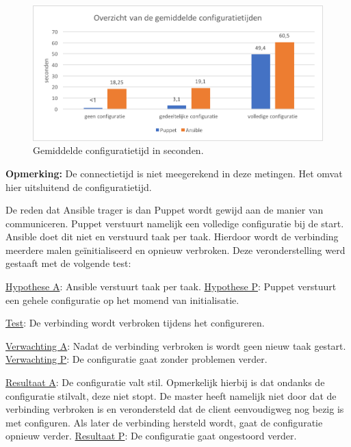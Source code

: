 \begin{figure}
	\includegraphics[width=\linewidth]{img/overzichtgemiddeldeconfigtijd.png} 
	\caption{Gemiddelde configuratietijd in seconden.}  
	\label{fig:deploytime_fullconfig}
\end{figure}

\textbf{Opmerking:} De \gls{connectietijd} is niet meegerekend in deze metingen. Het omvat hier uitsluitend de \gls{configuratietijd}.

De reden dat Ansible trager is dan Puppet wordt gewijd aan de manier van communiceren. Puppet verstuurt namelijk een volledige configuratie bij de start. Ansible doet dit niet en verstuurd taak per taak. Hierdoor wordt de verbinding meerdere malen ge\"initialiseerd en opnieuw verbroken. Deze veronderstelling werd gestaaft met de volgende test:

\begin{addmargin}[2em]{0cm}
\underline{Hypothese A}: Ansible verstuurt taak per taak.\newline
\underline{Hypothese P}: Puppet verstuurt een gehele configuratie op het momend van initialisatie.

\underline{Test}: De verbinding wordt verbroken tijdens het configureren.

\underline{Verwachting A}: Nadat de verbinding verbroken is wordt geen nieuw taak gestart.\newline
\underline{Verwachting P}: De configuratie gaat zonder problemen verder.

\underline{Resultaat A}: De configuratie valt stil. Opmerkelijk hierbij is dat ondanks de configuratie stilvalt, deze niet stopt. De master heeft namelijk niet door dat de verbinding verbroken is en verondersteld dat de client eenvoudigweg nog bezig is met configuren. Als later de verbinding hersteld wordt, gaat de configuratie opnieuw verder.\newline
\underline{Resultaat P}: De configuratie gaat ongestoord verder.
\end{addmargin}

